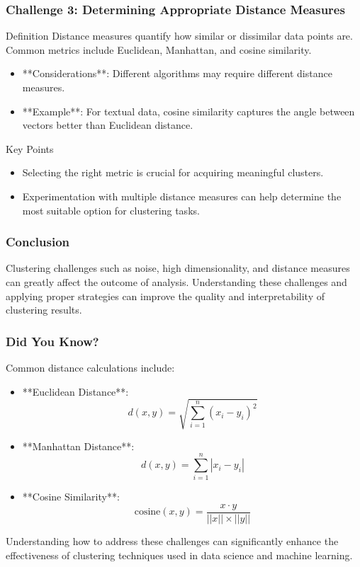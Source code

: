 \documentclass[aspectratio=169]{beamer}
\begin{document}
\begin{frame}[fragile]
    \frametitle{Challenge 3: Determining Appropriate Distance Measures}
    \begin{block}{Definition}
        Distance measures quantify how similar or dissimilar data points are. Common metrics include Euclidean, Manhattan, and cosine similarity.
    \end{block}
    
    \begin{itemize}
        \item **Considerations**: Different algorithms may require different distance measures.
        \item **Example**: For textual data, cosine similarity captures the angle between vectors better than Euclidean distance.
    \end{itemize}
    
    \begin{block}{Key Points}
        \begin{itemize}
            \item Selecting the right metric is crucial for acquiring meaningful clusters.
            \item Experimentation with multiple distance measures can help determine the most suitable option for clustering tasks.
        \end{itemize}
    \end{block}
\end{frame}

\begin{frame}[fragile]
    \frametitle{Conclusion}
    Clustering challenges such as noise, high dimensionality, and distance measures can greatly affect the outcome of analysis. Understanding these challenges and applying proper strategies can improve the quality and interpretability of clustering results.
\end{frame}

\begin{frame}[fragile]
    \frametitle{Did You Know?}
    Common distance calculations include:
    \begin{itemize}
        \item **Euclidean Distance**: 
            \begin{equation}
                d(x, y) = \sqrt{\sum_{i=1}^{n} (x_i - y_i)^2}
            \end{equation}
        \item **Manhattan Distance**: 
            \begin{equation}
                d(x, y) = \sum_{i=1}^{n} |x_i - y_i|
            \end{equation}
        \item **Cosine Similarity**: 
            \begin{equation}
                \text{cosine}(x, y) = \frac{x \cdot y}{||x|| \times ||y||}
            \end{equation}
    \end{itemize}
    Understanding how to address these challenges can significantly enhance the effectiveness of clustering techniques used in data science and machine learning.
\end{frame}
\end{document}
